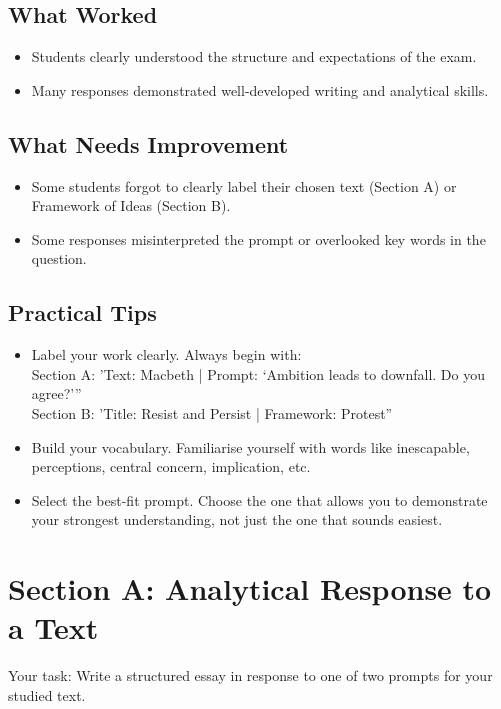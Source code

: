 \documentclass[a4paper]{article}
\begin{document}
\subsection{What Worked}
\begin{itemize}
    \item Students clearly understood the structure and expectations of the exam.
\item Many responses demonstrated well-developed writing and analytical skills.
\end{itemize}

\subsection{What Needs Improvement}
\begin{itemize}
    \item Some students forgot to clearly label their chosen text (Section A) or Framework of Ideas (Section B).
    \item Some responses misinterpreted the prompt or overlooked key words in the question.
\end{itemize}

\subsection{Practical Tips}
\begin{itemize}
    \item Label your work clearly. Always begin with:\\
    Section A: 'Text: Macbeth | Prompt: ‘Ambition leads to downfall. Do you agree?’”\\
    Section B: 'Title: Resist and Persist | Framework: Protest”

\item Build your vocabulary. Familiarise yourself with words like inescapable, perceptions, central concern, implication, etc.

\item Select the best-fit prompt. Choose the one that allows you to demonstrate your strongest understanding, not just the one that sounds easiest.
\end{itemize}

\newpage
\section{Section A: Analytical Response to a Text}
Your task: Write a structured essay in response to one of two prompts for your studied text.
\end{document}
